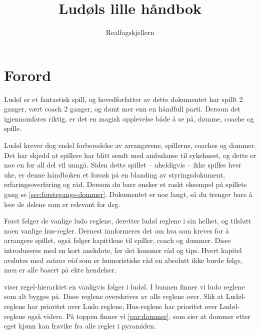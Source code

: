 \documentclass[10pt,a4paper,norsk,openany]{book}
\author{Realfagskjellern}
\title{Ludøls lille håndbok}
\begin{document}
\frontmatter

\maketitle

\section*{Forord}

Ludøl er et fantastisk spill, og hovedforfatter av dette dokumentet har spillt 2
ganger, vært coach 2 ganger, og dømt mer enn en håndfull parti. Dersom det
igjennomføres riktig, er det en magisk opplevelse både å se på, dømme, coache
og spille.  

Ludøl krever dog endel forberedelse av arrangørene, spillerne, coaches og
dommer. Det har skjedd at spillere har blitt sendt med ambulanse til sykehuset,
og dette er noe en for all del vil unngå. Siden dette spillet -- uheldigvis --
ikke spilles hver uke, er denne håndboken et forsøk på en blanding av
styringsdokument, erfaringsoverføring og råd. Dersom du bare ønsker et raskt
eksempel på spillets gang se \cref{sec:forstegangs-dommer}. Dokumentet er noe
langt, så du trenger bare å lese de delene som er relevant for deg.

Først følger de vanlige ludo reglene, deretter ludøl reglene i sin helhet, og
tilslutt noen vanlige hus-regler. Dernest innformeres det om hva som kreves for
å arrangere spillet, også følger kapittlene til spiller, coach og dommer. Disse
introduseres med en kort anekdote, før det kommer råd og tips. Hvert kapitel
avslutes med \emph{satans råd} som er humoristiske råd en absolutt ikke burde
følge, men er alle basert på ekte hendelser.

 viser regel-hierarkiet en vanligvis følger i ludøl. I
bunnen finner vi ludo reglene som alt bygges på. Disse reglene overskrives av
alle reglene over. Slik at Ludøl-reglene har prioritet over Ludo reglene,
Hus-reglene har prioritet over Ludøl-reglene også videre. På toppen finner vi
\cref{par:dommer}, som sier at dommer etter eget kjønn kan fravike fra alle regler i
pyramiden.

\begin{figure}[htbp!]
  \centering
  
  \caption{}
  \label{fig:maslows-ludol}
\end{figure}



\tableofcontents
\end{document}
